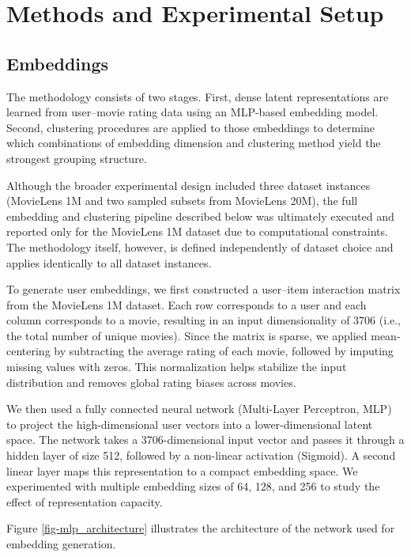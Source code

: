 \documentclass[
  11pt,
  letterpaper,
  DIV=11,
  numbers=noendperiod]{scrartcl}
\begin{document}
\section{Methods and Experimental
Setup}\label{sec-methods-and-experimental-setup}

\subsection{Embeddings}\label{embeddings}

The methodology consists of two stages. First, dense latent
representations are learned from user--movie rating data using an
MLP-based embedding model. Second, clustering procedures are applied to
those embeddings to determine which combinations of embedding dimension
and clustering method yield the strongest grouping structure.

Although the broader experimental design included three dataset
instances (MovieLens 1M and two sampled subsets from MovieLens 20M), the
full embedding and clustering pipeline described below was ultimately
executed and reported only for the MovieLens 1M dataset due to
computational constraints. The methodology itself, however, is defined
independently of dataset choice and applies identically to all dataset
instances.

To generate user embeddings, we first constructed a user--item
interaction matrix from the MovieLens 1M dataset. Each row corresponds
to a user and each column corresponds to a movie, resulting in an input
dimensionality of 3706 (i.e., the total number of unique movies). Since
the matrix is sparse, we applied mean-centering by subtracting the
average rating of each movie, followed by imputing missing values with
zeros. This normalization helps stabilize the input distribution and
removes global rating biases across movies.

We then used a fully connected neural network (Multi-Layer Perceptron,
MLP) to project the high-dimensional user vectors into a
lower-dimensional latent space. The network takes a 3706-dimensional
input vector and passes it through a hidden layer of size 512, followed
by a non-linear activation (Sigmoid). A second linear layer maps this
representation to a compact embedding space. We experimented with
multiple embedding sizes of 64, 128, and 256 to study the effect of
representation capacity.

Figure \ref{fig-mlp_architecture} illustrates the architecture of the
network used for embedding generation.
\end{document}
